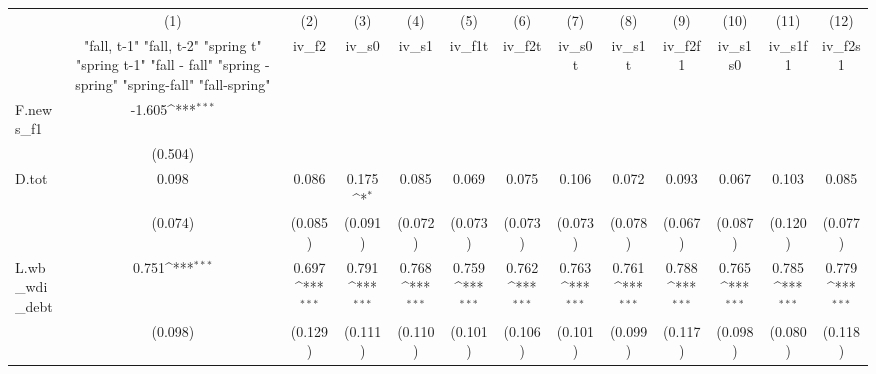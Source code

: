 {
\def\sym#1{\ifmmode^{#1}\else\(^{#1}\)\fi}
\begin{tabular}{l*{12}{c}}
\toprule
            &\multicolumn{1}{c}{(1)}&\multicolumn{1}{c}{(2)}&\multicolumn{1}{c}{(3)}&\multicolumn{1}{c}{(4)}&\multicolumn{1}{c}{(5)}&\multicolumn{1}{c}{(6)}&\multicolumn{1}{c}{(7)}&\multicolumn{1}{c}{(8)}&\multicolumn{1}{c}{(9)}&\multicolumn{1}{c}{(10)}&\multicolumn{1}{c}{(11)}&\multicolumn{1}{c}{(12)}\\
            &\multicolumn{1}{c}{  "fall, t-1" "fall, t-2" "spring t" "spring t-1"  "fall - fall" "spring - spring" "spring-fall" "fall-spring" }&\multicolumn{1}{c}{iv\_f2}&\multicolumn{1}{c}{iv\_s0}&\multicolumn{1}{c}{iv\_s1}&\multicolumn{1}{c}{iv\_f1t}&\multicolumn{1}{c}{iv\_f2t}&\multicolumn{1}{c}{iv\_s0t}&\multicolumn{1}{c}{iv\_s1t}&\multicolumn{1}{c}{iv\_f2f1}&\multicolumn{1}{c}{iv\_s1s0}&\multicolumn{1}{c}{iv\_s1f1}&\multicolumn{1}{c}{iv\_f2s1}\\
\midrule
F.news\_f1   &      -1.605\sym{***}&                     &                     &                     &                     &                     &                     &                     &                     &                     &                     &                     \\
            &     (0.504)         &                     &                     &                     &                     &                     &                     &                     &                     &                     &                     &                     \\
\addlinespace
D.tot       &       0.098         &       0.086         &       0.175\sym{*}  &       0.085         &       0.069         &       0.075         &       0.106         &       0.072         &       0.093         &       0.067         &       0.103         &       0.085         \\
            &     (0.074)         &     (0.085)         &     (0.091)         &     (0.072)         &     (0.073)         &     (0.073)         &     (0.073)         &     (0.078)         &     (0.067)         &     (0.087)         &     (0.120)         &     (0.077)         \\
\addlinespace
L.wb\_wdi\_debt&       0.751\sym{***}&       0.697\sym{***}&       0.791\sym{***}&       0.768\sym{***}&       0.759\sym{***}&       0.762\sym{***}&       0.763\sym{***}&       0.761\sym{***}&       0.788\sym{***}&       0.765\sym{***}&       0.785\sym{***}&       0.779\sym{***}\\
            &     (0.098)         &     (0.129)         &     (0.111)         &     (0.110)         &     (0.101)         &     (0.106)         &     (0.101)         &     (0.099)         &     (0.117)         &     (0.098)         &     (0.080)         &     (0.118)         \\

\end{tabular}}
